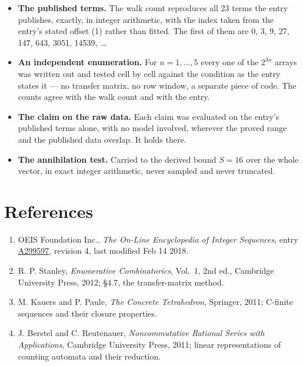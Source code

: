 \documentclass[11pt]{article}
\theoremstyle{definition}
\begin{document}
\begin{itemize}

\item {\bfseries The published terms.} The walk count reproduces all 23 terms the entry publishes, exactly, in integer arithmetic, with the index taken from the entry's stated offset (1) rather than fitted. The first of them are 0, 3, 9, 27, 147, 643, 3051, 14539,~\dots

\item {\bfseries An independent enumeration.} For $n = 1,\dots,5$ every one of the $2^{3n}$ arrays was written out and tested cell by cell against the condition as the entry states it --- no transfer matrix, no row window, a separate piece of code. The counts agree with the walk count and with the entry.

\item {\bfseries The claim on the raw data.} Each claim was evaluated on the entry's published terms alone, with no model involved, wherever the proved range and the published data overlap. It holds there.

\item {\bfseries The annihilation test.} Carried to the derived bound $S = 16$ over the whole vector, in exact integer arithmetic, never sampled and never truncated.

\end{itemize}

\section{References}

\begin{enumerate}

\item OEIS Foundation Inc., \emph{The On-Line Encyclopedia of Integer Sequences}, entry \href{https://oeis.org/A299597}{A299597}, revision 4, last modified Feb 14 2018.

\item R. P. Stanley, \emph{Enumerative Combinatorics}, Vol.~1, 2nd ed., Cambridge University Press, 2012; \S4.7, the transfer-matrix method.

\item M. Kauers and P. Paule, \emph{The Concrete Tetrahedron}, Springer, 2011; C-finite sequences and their closure properties.

\item J. Berstel and C. Reutenauer, \emph{Noncommutative Rational Series with Applications}, Cambridge University Press, 2011; linear representations of counting automata and their reduction.

\end{enumerate}
\end{document}
